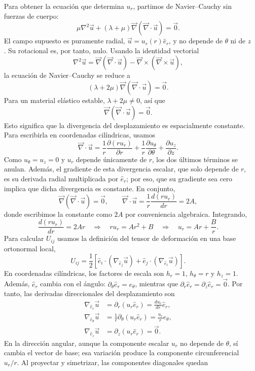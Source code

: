 \documentclass[a4paper]{article}
\begin{document}
Para obtener la ecuación que determina $u_r$, partimos de Navier--Cauchy sin fuerzas de cuerpo:
\[
\mu\nabla^2\vec u+(\lambda+\mu)\vec\nabla(\vec\nabla\cdot\vec u)=\vec 0.
\]
El campo supuesto es puramente radial, $\vec u=u_r(r)\hat e_r$, y no depende de $\theta$ ni de $z$. Su rotacional es, por tanto, nulo. Usando la identidad vectorial
\[
\nabla^2\vec u
=\vec\nabla(\vec\nabla\cdot\vec u)
-\vec\nabla\times(\vec\nabla\times\vec u),
\]
la ecuación de Navier--Cauchy se reduce a
\[
(\lambda+2\mu)\vec\nabla(\vec\nabla\cdot\vec u)=\vec 0.
\]
Para un material elástico estable, $\lambda+2\mu\ne0$, así que
\[
\vec\nabla(\vec\nabla\cdot\vec u)=\vec 0.
\]
Esto significa que la divergencia del desplazamiento es espacialmente constante. Para escribirla en coordenadas cilíndricas, usamos
\[
\vec\nabla\cdot\vec u
=\frac{1}{r}\frac{\partial(ru_r)}{\partial r}
+\frac{1}{r}\frac{\partial u_\theta}{\partial\theta}
+\frac{\partial u_z}{\partial z}.
\]
Como $u_\theta=u_z=0$ y $u_r$ depende únicamente de $r$, los dos últimos términos se anulan. Además, el gradiente de esta divergencia escalar, que solo depende de $r$, es su derivada radial multiplicada por $\hat e_r$; por eso, que su gradiente sea cero implica que dicha divergencia es constante. En conjunto,
\[
\vec\nabla(\vec\nabla\cdot\vec u)=\vec 0,
\qquad
\vec\nabla\cdot\vec u
=\frac{1}{r}\frac{d(ru_r)}{dr}=2A,
\]
donde escribimos la constante como $2A$ por conveniencia algebraica. Integrando,
\[
\frac{d(ru_r)}{dr}=2Ar
\quad\Longrightarrow\quad
ru_r=Ar^2+B
\quad\Longrightarrow\quad
u_r=Ar+\frac{B}{r}.
\]
Para calcular $U_{ij}$ usamos la definición del tensor de deformación en una base ortonormal local,
\[
U_{ij}=\frac12\left[
\hat e_i\cdot\left(\nabla_{\hat e_j}\vec u\right)
+\hat e_j\cdot\left(\nabla_{\hat e_i}\vec u\right)
\right].
\]
En coordenadas cilíndricas, los factores de escala son $h_r=1$, $h_\theta=r$ y $h_z=1$. Además, $\hat e_r$ cambia con el ángulo: $\partial_\theta\hat e_r=\hat e_\theta$, mientras que $\partial_r\hat e_r=\partial_z\hat e_r=\vec 0$. Por tanto, las derivadas direccionales del desplazamiento son
\[
\begin{aligned}
\nabla_{\hat e_r}\vec u
&=\partial_r(u_r\hat e_r)
=\frac{du_r}{dr}\hat e_r,\\
\nabla_{\hat e_\theta}\vec u
&=\frac{1}{r}\partial_\theta(u_r\hat e_r)
=\frac{u_r}{r}\hat e_\theta,\\
\nabla_{\hat e_z}\vec u
&=\partial_z(u_r\hat e_r)=\vec 0.
\end{aligned}
\]
En la dirección angular, aunque la componente escalar $u_r$ no depende de $\theta$, sí cambia el vector de base; esa variación produce la componente circunferencial $u_r/r$. Al proyectar y simetrizar, las componentes diagonales quedan
\end{document}
